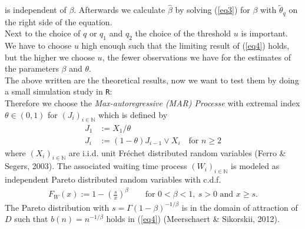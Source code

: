 \documentclass[10pt, a4paper]{article}\usepackage[]{graphicx}\usepackage[]{color}
\renewcommand{\ge}{\geqslant}
\begin{document}
is independent of $\beta$. Afterwards we calculate $\hat{\beta}$ by solving (\ref{eq3}) for $\beta$ with $\widetilde{\theta}_q$ on the right side of the equation.
\\
Next to the choice of $q$ or $q_1$ and $q_2$ the choice of the threshold $u$ is important. We have to choose $u$ high enouqh such that the limiting result of (\ref{eq4}) holds, but the higher we choose $u$, the fewer observations we have for the estimates of the parameters $\beta$ and $\theta$.
\\
The above written are the theoretical results, now we want to test them by doing a small simulation study in \texttt{R}:
\\
Therefore we choose the \emph{Max-autoregressive (MAR) Processe} with extremal index $\theta \in (0,1)$ for $(J_i)_{i \in \mathbb{N}}$ which is defined by
\begin{align}
J_1&:=X_1/\theta \\
J_i&:=(1-\theta) J_{i-1} \vee X_i \quad \text{for \ } n \ge 2
\end{align}
where $(X_i)_{i \in \mathbb{N}}$ are i.i.d. unit Fr{\'e}chet distributed random variables (Ferro \& Segers, 2003).
The associated waiting time process $(W_i)_{i \in \mathbb{N}}$ is modeled as independent Pareto distributed random variables with c.d.f.
\begin{align}
	F_W(x):=1-\left(\frac{s}{x}\right)^{\beta} \qquad \text{for } 0<\beta<1, \ s>0 \text{ and } x\ge s.
\end{align}
The Pareto distribution with $s=\Gamma(1-\beta)^{-1/\beta}$ is in the domain of attraction of $D$ such that $b(n)=n^{-1/\beta}$ holds in (\ref{eq4}) (Meerschaert \& Sikorskii, 2012).
\end{document}
